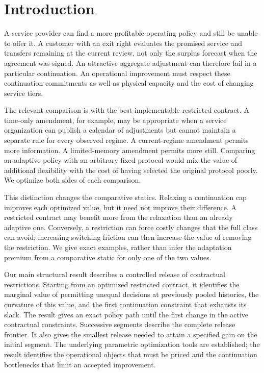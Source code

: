 \documentclass[11pt,letterpaper]{article}
\theoremstyle{definition}\newtheorem{assumption}[theorem]{Assumption}
\begin{document}
\section{Introduction}
A service provider can find a more profitable operating policy and still be unable to offer it. A customer with an exit right evaluates the promised service and transfers remaining at the current review, not only the surplus forecast when the agreement was signed. An attractive aggregate adjustment can therefore fail in a particular continuation. An operational improvement must respect these continuation commitments as well as physical capacity and the cost of changing service tiers.

The relevant comparison is with the best implementable restricted contract. A time-only amendment, for example, may be appropriate when a service organization can publish a calendar of adjustments but cannot maintain a separate rule for every observed regime. A current-regime amendment permits more information. A limited-memory amendment permits more still. Comparing an adaptive policy with an arbitrary fixed protocol would mix the value of additional flexibility with the cost of having selected the original protocol poorly. We optimize both sides of each comparison.

This distinction changes the comparative statics. Relaxing a continuation cap improves each optimized value, but it need not improve their difference. A restricted contract may benefit more from the relaxation than an already adaptive one. Conversely, a restriction can force costly changes that the full class can avoid; increasing switching friction can then increase the value of removing the restriction. We give exact examples, rather than infer the adaptation premium from a comparative static for only one of the two values.

Our main structural result describes a controlled release of contractual restrictions. Starting from an optimized restricted contract, it identifies the marginal value of permitting unequal decisions at previously pooled histories, the curvature of this value, and the first continuation constraint that exhausts its slack. The result gives an exact policy path until the first change in the active contractual constraints. Successive segments describe the complete release frontier. It also gives the smallest release needed to attain a specified gain on the initial segment. The underlying parametric optimization tools are established; the result identifies the operational objects that must be priced and the continuation bottlenecks that limit an accepted improvement.
\end{document}
